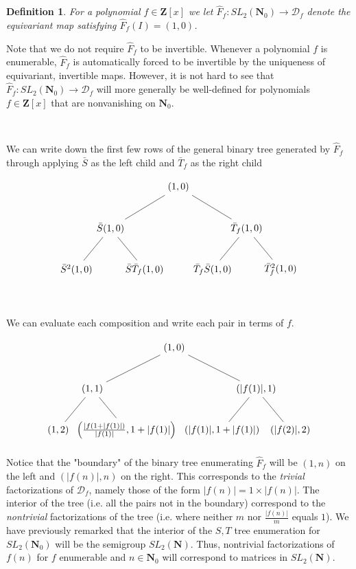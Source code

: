 \documentclass{article}
\newtheorem{definition}[theorem]{Definition}  %
\begin{document}
\begin{definition}
For a polynomial $f \in \mathbf{Z}[x]$ we let $\hat{F}_f: SL_2(\mathbf{N}_0) \rightarrow \mathcal{D}_f$ denote the equivariant map satisfying $\hat{F}_f(I) = (1,0)$.
\end{definition}

Note that we do not require $\hat{F}_f$ to be invertible. Whenever a polynomial $f$ is enumerable, $\hat{F}_f$ is automatically forced to be invertible by the uniqueness of equivariant, invertible maps. However, it is not hard to see that $\hat{F}_f: SL_2(\mathbf{N}_0) \rightarrow \mathcal{D}_f$ will more generally be well-defined for polynomials $f \in \mathbf{Z}[x]$ that are nonvanishing on $\mathbf{N}_0$.


\

We can write down the first few rows of the general binary tree generated by $\hat{F}_f$ through applying $\bar{S}$ as the left child and $\bar{T}_f$ as the right child

$$
\begin{tikzpicture}[level distance=15mm, 
                    level 1/.style={sibling distance=50mm},
                    level 2/.style={sibling distance=25mm}]
  \node {\((1, 0)\)}
    child {
      node {\(\bar{S}(1,0)\)} 
      child {
        node {\(\bar{S}^2(1,0)\)}
      }
      child {
        node {\(\bar{S}\bar{T}_f(1,0)\)}
      }
    }
    child {
      node {\(\bar{T}_f(1,0)\)}
      child {
        node {\(\bar{T}_f\bar{S}(1,0)\)}
      }
      child {
        node {\(\bar{T}_f^2(1,0)\)}
      } 
    };
\end{tikzpicture}
$$

\

We can evaluate each composition and write each pair in terms of $f$.

$$
\begin{tikzpicture}[level distance=15mm, 
                    level 1/.style={sibling distance=60mm},
                    level 2/.style={sibling distance=25mm}]
  \node {\((1, 0)\)}
    child {
      node {\((1, 1)\)} 
      child {
        node {\((1, 2)\)}
      }
      child {
        node {\(\left(\frac{|f(1 + |f(1)|)}{|f(1)|}, 1 + |f(1)|\right)\)}
      }
    }
    child {
      node {\(\left(|f(1)|, 1\right)\)}
      child {
        node {\(\left(|f(1)|, 1 + |f(1)|\right)\)}
      }
      child {
        node {\(\left(|f(2)|, 2\right)\)}
      } 
    };
\end{tikzpicture}
$$


Notice that the "boundary" of the binary tree enumerating $\hat{F}_f$ will be $(1, n)$ on the left and $(|f(n)|, n)$ on the right. This corresponds to the \textit{trivial} factorizations of $\mathcal{D}_f$, namely those of the form $|f(n)| = 1 \times |f(n)|$. The interior of the tree (i.e. all the pairs not in the boundary) correspond to the \textit{nontrivial} factorizations of the tree (i.e. where neither $m$ nor $\frac{|f(n)|}{m}$ equals $1$). We have previously remarked that the interior of the $S, T$ tree enumeration for $SL_2(\mathbf{N}_0)$ will be the semigroup $SL_2(\mathbf{N})$. Thus, nontrivial factorizations of $f(n)$ for $f$ enumerable and $n \in \mathbf{N}_0$ will correspond to matrices in $SL_2(\mathbf{N})$.
\end{document}
